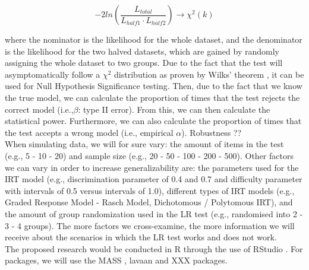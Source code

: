 \documentclass{article}
\begin{document}
\begin{equation}
- 2ln (\frac{L_{total}}{L_{half1}\cdot L_{half2}}) \rightarrow \chi^{2}(k)
\end{equation}

where the nominator is the likelihood for the whole dataset, and the denominator is the likelihood for the two halved datasets, which are gained by randomly assigning the whole dataset to two groups. Due to the fact that the test will asymptomatically follow a $\chi^2$ distribution as proven by Wilks' theorem \autocite{wilkth}, it can be used for Null Hypothesis Significance testing. Then, due to the fact that we know the true model, we can calculate the proportion of times that the test rejects the correct model (i.e.,$\beta$: type II error). From this, we can then calculate the statistical power. Furthermore, we can also calculate the proportion of times that the test accepts a wrong model (i.e., empirical $\alpha$). Robustness ?? \\
\indent When simulating data, we will for sure vary: the amount of items in the test (e.g., 5 - 10 - 20) and sample size (e.g., 20 - 50 - 100 - 200 - 500). Other factors we can vary in order to increase generalizability are: the parameters used for the IRT model (e.g., discrimination parameter of 0.4 and 0.7 and difficulty parameter with intervals of 0.5 versus intervals of 1.0), different types of IRT models (e.g., Graded Response Model - Rasch Model, Dichotomous / Polytomous IRT), and the amount of group randomization used in the LR test (e.g., randomised into 2 - 3 - 4 groups). The more factors we cross-examine, the more information we will receive about the scenarios in which the LR test works and does not work. \\
\indent The proposed research would be conducted in R \autocite{R} through the use of RStudio \autocite{Rstudio}. For packages, we will use the MASS \autocite{mass}, lavaan \autocite{lavaan} and XXX packages. 


\nocite{*}

\newpage
\printbibliography
\end{document}
